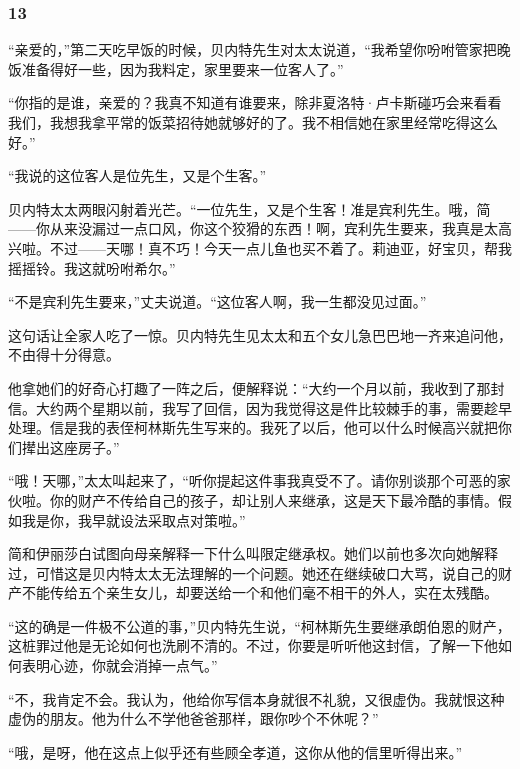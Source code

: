 \subsubsection*{13}

\par “亲爱的，”第二天吃早饭的时候，贝内特先生对太太说道，“我希望你吩咐管家把晚饭准备得好一些，因为我料定，家里要来一位客人了。”
\par “你指的是谁，亲爱的？我真不知道有谁要来，除非夏洛特·卢卡斯碰巧会来看看我们，我想我拿平常的饭菜招待她就够好的了。我不相信她在家里经常吃得这么好。”
\par “我说的这位客人是位先生，又是个生客。”
\par 贝内特太太两眼闪射着光芒。“一位先生，又是个生客！准是宾利先生。哦，简——你从来没漏过一点口风，你这个狡猾的东西！啊，宾利先生要来，我真是太高兴啦。不过——天哪！真不巧！今天一点儿鱼也买不着了。莉迪亚，好宝贝，帮我摇摇铃。我这就吩咐希尔。”
\par “不是宾利先生要来，”丈夫说道。“这位客人啊，我一生都没见过面。”
\par 这句话让全家人吃了一惊。贝内特先生见太太和五个女儿急巴巴地一齐来追问他，不由得十分得意。
\par 他拿她们的好奇心打趣了一阵之后，便解释说：“大约一个月以前，我收到了那封信。大约两个星期以前，我写了回信，因为我觉得这是件比较棘手的事，需要趁早处理。信是我的表侄柯林斯先生写来的。我死了以后，他可以什么时候高兴就把你们撵出这座房子。”
\par “哦！天哪，”太太叫起来了，“听你提起这件事我真受不了。请你别谈那个可恶的家伙啦。你的财产不传给自己的孩子，却让别人来继承，这是天下最冷酷的事情。假如我是你，我早就设法采取点对策啦。”
\par 简和伊丽莎白试图向母亲解释一下什么叫限定继承权。她们以前也多次向她解释过，可惜这是贝内特太太无法理解的一个问题。她还在继续破口大骂，说自己的财产不能传给五个亲生女儿，却要送给一个和他们毫不相干的外人，实在太残酷。
\par “这的确是一件极不公道的事，”贝内特先生说，“柯林斯先生要继承朗伯恩的财产，这桩罪过他是无论如何也洗刷不清的。不过，你要是听听他这封信，了解一下他如何表明心迹，你就会消掉一点气。”
\par “不，我肯定不会。我认为，他给你写信本身就很不礼貌，又很虚伪。我就恨这种虚伪的朋友。他为什么不学他爸爸那样，跟你吵个不休呢？”
\par “哦，是呀，他在这点上似乎还有些顾全孝道，这你从他的信里听得出来。”
